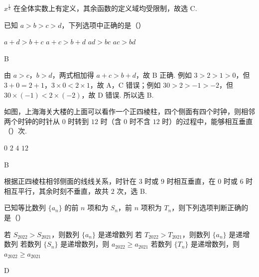 \begin{solution}
\(x^{\frac{1}{3}}\) 在全体实数上有定义，其余函数的定义域均受限制，故选 C.
\end{solution}

\begin{problem}
已知 \(a>b>c>d\)，下列选项中正确的是（\quad）

\choices
    {\(a+d>b+c\)}
    {\(a+c>b+d\)}
    {\(ad>bc\)}
    {\(ac>bd\)}
\end{problem}

\begin{answer}
B
\end{answer}

\begin{solution}
由 \(a>c\)，\(b>d\)，两式相加得 \(a+c>b+d\)，故 B 正确. 例如 \(3>2>1>0\)，但 \(3+0=2+1\)，\(3\times0<2\times1\)，故 A，C 错误；例如 \(30>2>-1>-2\)，但 \(30\times(-1)<2\times(-2)\)，故 D 错误. 所以选 B.
\end{solution}

\begin{problem}
如图，上海海关大楼的上面可以看作一个正四棱柱，四个侧面有四个时钟，则相邻两个时钟的时针从 \(0\) 时转到 \(12\) 时（含 \(0\) 时不含 \(12\) 时）的过程中，能够相互垂直（\quad）次.


\choices
    {\(0\)}
    {\(2\)}
    {\(4\)}
    {\(12\)}
\end{problem}

\begin{answer}
B
\end{answer}

\begin{solution}
根据正四棱柱相邻侧面的线线关系，时针在 \(3\) 时或 \(9\) 时相互垂直，在 \(0\) 时或 \(6\) 时相互平行，其余时刻不垂直，故共 \(2\) 次，选 B.
\end{solution}

\begin{problem}
已知等比数列 \(\{a_n\}\) 的前 \(n\) 项和为 \(S_n\)，前 \(n\) 项积为 \(T_n\)，则下列选项判断正确的是（\quad）

\choices
    {若 \(S_{2022}>S_{2021}\)，则数列 \(\{a_n\}\) 是递增数列}
    {若 \(T_{2022}>T_{2021}\)，则数列 \(\{a_n\}\) 是递增数列}
    {若数列 \(\{S_n\}\) 是递增数列，则 \(a_{2022}\ge a_{2021}\)}
    {若数列 \(\{T_n\}\) 是递增数列，则 \(a_{2022}\ge a_{2021}\)}
\end{problem}

\begin{answer}
D
\end{answer}

